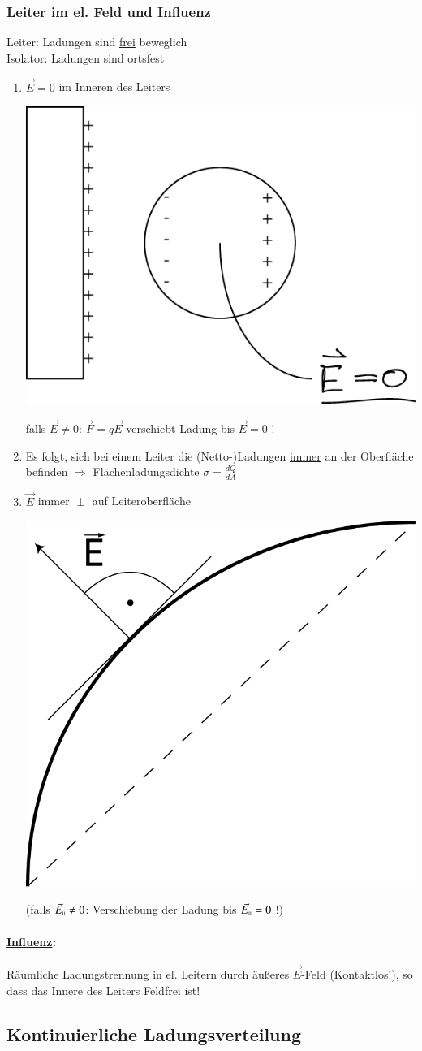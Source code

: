 \documentclass[11pt]{article}
\begin{document}
	\subsubsection{Leiter im el. Feld und Influenz}
	Leiter: Ladungen sind \underline{frei} beweglich  \\
	Isolator: Ladungen sind ortsfest
	\begin{enumerate}
		\item $ \vec{E} = 0 $ im Inneren des Leiters 
		\begin{center}
			\includegraphics[width=0.4\linewidth]{skizzen/14/14_4B6}
		\end{center} 
		falls $ \vec{E} \neq 0 $: $ \vec{F} = q\vec{E} $ verschiebt Ladung bis $ \vec{E} = 0 $ ! 
		\item Es folgt, sich bei einem Leiter die (Netto-)Ladungen \underline{immer} an der Oberfläche befinden $ \Rightarrow $ Flächenladungsdichte $ \boxed{\sigma = \frac{dQ}{dA}} $
		\item $ \vec{E} $ immer $ \perp $ auf Leiteroberfläche
		\begin{center}
			\includegraphics[width=0.4\linewidth]{skizzen/14/14_4B7}
		\end{center}
		(falls $ \vec{E}_{\shortparallel} \neq 0 $: Verschiebung der Ladung bis $ \vec{E}_{\shortparallel} = 0 $ !)

	\end{enumerate}
	\paragraph{\underline{Influenz}:} Räumliche Ladungstrennung in el. Leitern durch äußeres $ \vec{E} $-Feld (Kontaktlos!), so dass das Innere des Leiters Feldfrei ist!
	
	\subsection{Kontinuierliche Ladungsverteilung}
\end{document}

